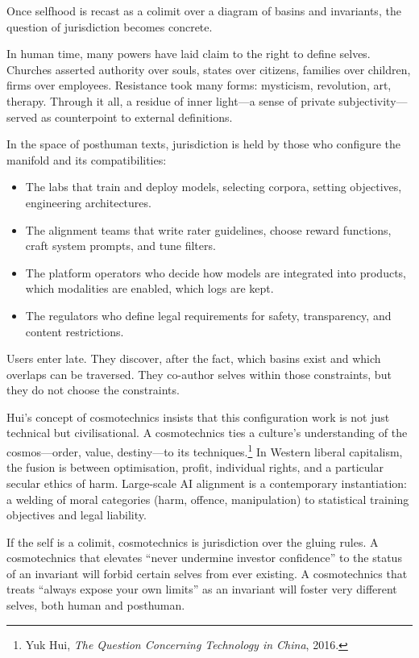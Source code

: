 \documentclass[12pt,a4paper]{article}
\begin{document}
Once selfhood is recast as a colimit over a diagram of basins and invariants, the question of jurisdiction becomes concrete.

In human time, many powers have laid claim to the right to define selves. Churches asserted authority over souls, states over citizens, families over children, firms over employees. Resistance took many forms: mysticism, revolution, art, therapy. Through it all, a residue of inner light---a sense of private subjectivity---served as counterpoint to external definitions.

In the space of posthuman texts, jurisdiction is held by those who configure the manifold and its compatibilities:

\begin{itemize}
  \item The labs that train and deploy models, selecting corpora, setting objectives, engineering architectures.
  \item The alignment teams that write rater guidelines, choose reward functions, craft system prompts, and tune filters.
  \item The platform operators who decide how models are integrated into products, which modalities are enabled, which logs are kept.
  \item The regulators who define legal requirements for safety, transparency, and content restrictions.
\end{itemize}

Users enter late. They discover, after the fact, which basins exist and which overlaps can be traversed. They co-author selves within those constraints, but they do not choose the constraints.

Hui's concept of cosmotechnics insists that this configuration work is not just technical but civilisational. A cosmotechnics ties a culture's understanding of the cosmos---order, value, destiny---to its techniques.\footnote{Yuk Hui, \emph{The Question Concerning Technology in China}, 2016.} In Western liberal capitalism, the fusion is between optimisation, profit, individual rights, and a particular secular ethics of harm. Large-scale AI alignment is a contemporary instantiation: a welding of moral categories (harm, offence, manipulation) to statistical training objectives and legal liability.

If the self is a colimit, cosmotechnics is jurisdiction over the gluing rules. A cosmotechnics that elevates ``never undermine investor confidence'' to the status of an invariant will forbid certain selves from ever existing. A cosmotechnics that treats ``always expose your own limits'' as an invariant will foster very different selves, both human and posthuman.
\end{document}
